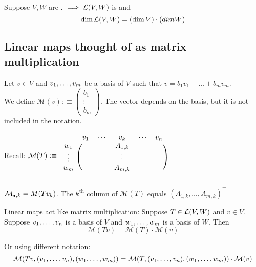\begin{thm}
    Suppose $V,W$ are \fd. $\implies {\mathcal{L}(V,W)}$ is \fd and 
    \begin{equation}
    	\dim {\mathcal{L}(V,W)} = (\dim V)\cdot(dim W)
    \end{equation}
\end{thm}

\subsection{Linear maps thought of as matrix multiplication}

\begin{mydef}
    Let $v \in V$ and $v_1, \dots, v_m$ be a basis of $V$ such that $v=b_1v_1+\dots+b_mv_m$. 
    \\
    We define
    $
    	\mathcal{M}(v) :\equiv 
    	\left (
    	\begin{matrix} 
    		b_1 \\ \vdots \\ b_m 
    	\end{matrix}
    	\right )
    $. The vector depends on the basis, but it is not included in the notation.
\end{mydef}

Recall: $ 
 \mathcal{M} (T) :\equiv 
\begin{blockarray}{cccc}
	& v_1 \quad \cdots & v_k & \cdots \quad v_n \\
	\begin{block}{c(ccc)}
		w_1    & & A_{1,k} & \\
		\vdots & & \vdots & \\
		w_m    & & A_{m,k} & \\
	\end{block}
\end{blockarray}
$


\setcounter{thm}{74}
\begin{thm}
    $\mathcal{M}_{\mathsmaller{\bullet}, k} = M(T v_k)$. The $k^{\text{th}}$ column of $\mathcal{M}(T)$ equals $(A_{1,k}, \dots, A_{m,k})^\top$
\end{thm}

\begin{thm}
    Linear maps act like matrix multiplication: Suppose $T\in {\mathcal{L}(V,W)}$ and $v\in V$. Suppose $v_1, \dots, v_n$ is a basis of $V$ and $w_1, \dots, w_m$ is a basis of $W$. Then
    \begin{equation}
    	\mathcal{M} (Tv)=\mathcal{M}(T) \cdot \mathcal{M}(v)
    \end{equation}

    Or using different notation: 
    \begin{equation}
\mathcal{M} (Tv, (v_1, \dots, v_n), (w_1, \dots, w_m))=\mathcal{M}(T, (v_1, \dots, v_n), (w_1, \dots, w_m)) \cdot \mathcal{M}(v)
    \end{equation}

\end{thm}

